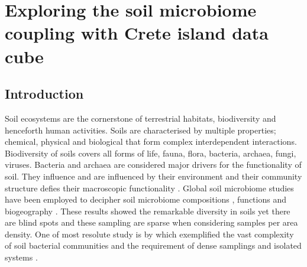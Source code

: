 % 
% 


\chapter{Exploring the soil microbiome coupling with Crete island data cube}
\label{cha:crete-soil}


\section{Introduction}\label{intro_integration}

Soil ecosystems are the cornerstone of terrestrial habitats, biodiversity and henceforth human activities.
Soils are characterised by multiple properties; chemical, physical and biological that 
form complex interdependent interactions. Biodiversity of soils covers
all forms of life, fauna, flora, bacteria, archaea, fungi, viruses. 
Bacteria and archaea are considered major drivers for the functionality of soil.
They influence and are influenced by their environment and their community structure 
defies their macroscopic functionality \parencite{Bahram2018}.
Global soil microbiome studies have been employed to decipher soil microbiome
compositions \parencite{thompson2017a-communal, Delgado-Baquerizo-atlas, Labouyrie2023},
functions \parencite{Bahram2018} and biogeography \parencite{Martiny2006, guerra2020Blind}.
These results showed the remarkable diversity in soils yet there are blind spots \parencite{guerra2020Blind}
and these sampling are sparse when considering samples per area density. One of most resolute
study is by \parencite{Karimi2020} which exemplified the 
vast complexity of soil bacterial communities and the requirement of
dense samplings and isolated systems \parencite{Dini-Andreote2021}.

